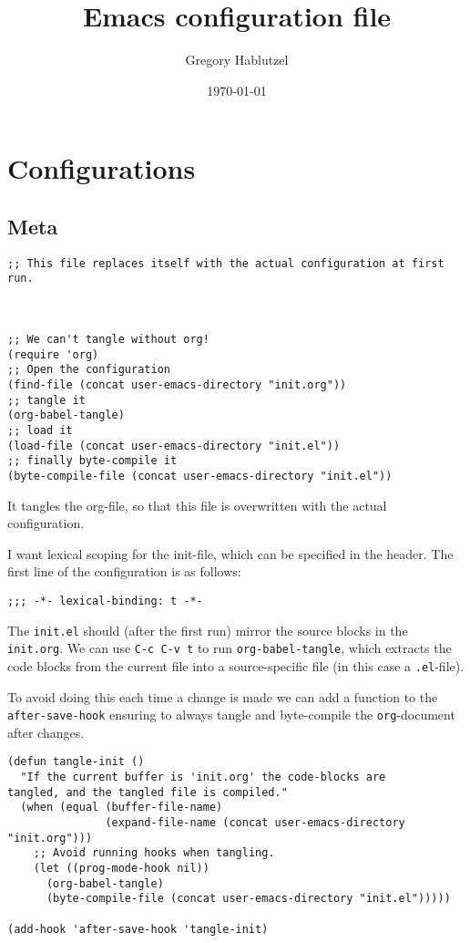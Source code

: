 \documentclass[11pt]{article}
\author{Gregory Hablutzel}
\date{\today}
\title{Emacs configuration file}
\begin{document}
\maketitle
\tableofcontents





\section{Configurations}
\label{sec:org13c7243}
\subsection{Meta}
\label{sec:org789f59a}

\begin{verbatim}
;; This file replaces itself with the actual configuration at first run.



;; We can't tangle without org!
(require 'org)
;; Open the configuration
(find-file (concat user-emacs-directory "init.org"))
;; tangle it
(org-babel-tangle)
;; load it
(load-file (concat user-emacs-directory "init.el"))
;; finally byte-compile it
(byte-compile-file (concat user-emacs-directory "init.el"))
\end{verbatim}


It tangles the org-file, so that this file is overwritten with the actual
configuration.



I want lexical scoping for the init-file, which can be specified in the
header. The first line of the configuration is as follows:

\begin{verbatim}
;;; -*- lexical-binding: t -*-
\end{verbatim}

The \texttt{init.el} should (after the first run) mirror the source blocks in
the \texttt{init.org}. We can use \texttt{C-c C-v t} to run \texttt{org-babel-tangle}, which
extracts the code blocks from the current file into a source-specific
file (in this case a \texttt{.el}-file).

To avoid doing this each time a change is made we can add a function to
the \texttt{after-save-hook} ensuring to always tangle and byte-compile the
\texttt{org}-document after changes.

\begin{verbatim}
(defun tangle-init ()
  "If the current buffer is 'init.org' the code-blocks are
tangled, and the tangled file is compiled."
  (when (equal (buffer-file-name)
               (expand-file-name (concat user-emacs-directory "init.org")))
    ;; Avoid running hooks when tangling.
    (let ((prog-mode-hook nil))
      (org-babel-tangle)
      (byte-compile-file (concat user-emacs-directory "init.el")))))

(add-hook 'after-save-hook 'tangle-init)
\end{verbatim}
\end{document}
